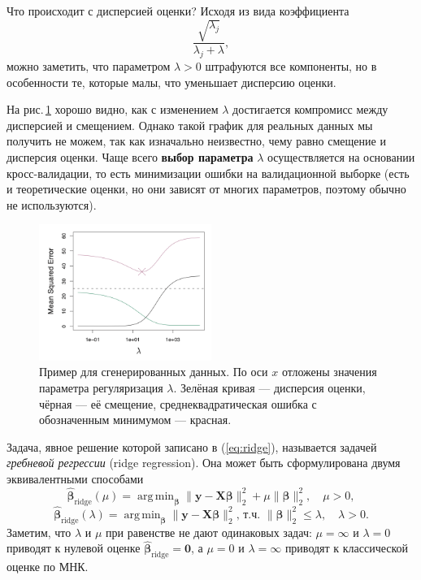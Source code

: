 \documentclass[12pt,a4paper,final]{article}
\newcommand{\betah}{\hat{\bm \beta}}
\newcommand{\betaa}{\bm{\beta}}
\newcommand{\X}{\bm{X}}
\newcommand{\1}{\mathds{1}}
\DeclareMathOperator*{\argmin}{arg\,min}
\begin{document}
Что происходит с дисперсией оценки? Исходя из вида коэффициента
$$
\frac{\sqrt{\lambda_j}}{\lambda_j + \lambda},
$$
можно заметить, что параметром $\lambda > 0$ штрафуются все компоненты, но в особенности те, которые малы, что уменьшает дисперсию оценки.

На рис.\,\ref{fig:rid} хорошо видно, как с изменением $\lambda$ достигается компромисс между дисперсией и смещением. Однако такой график для реальных данных мы получить не можем, так как изначально неизвестно, чему равно смещение и дисперсия оценки.
Чаще всего \textbf{выбор параметра} $\lambda$ осуществляется на основании кросс-валидации, то есть минимизации ошибки на валидационной выборке (есть и теоретические оценки, но они зависят от многих параметров, поэтому обычно не используются). 

\begin{figure}[]
\centering
\includegraphics[width=0.5\textwidth]{ridge2.png}
\caption{Пример для сгенерированных данных. По оси $x$ отложены значения параметра регуляризация $\lambda$. Зелёная кривая --- дисперсия оценки, чёрная --- её смещение, среднеквадратическая ошибка с обозначенным минимумом --- красная.}
\label{fig:rid}
\end{figure}

Задача, явное решение которой записано в (\ref{eq:ridge}), называется задачей \textit{гребневой регрессии} (ridge regression). Она может быть сформулирована двумя эквивалентными способами
\begin{equation}
\label{eq:rid1}
 \betah_{\text{ridge}}(\mu) = \argmin_{\betaa}{\|\bm y - \X\betaa\|^2_2 +\mu \|\betaa\|^2_2}, \quad \mu >0,
\end{equation}
\begin{equation}
\label{eq:rid2}
\betah_{\text{ridge}}(\lambda) = \argmin_{\betaa}{\|\bm y - \X\betaa\|^2_2 \text{, т.ч. } \|\betaa\|^2_2 \leqslant \lambda}, \quad \lambda >0.
\end{equation}
Заметим, что $\lambda$ и $\mu$ при равенстве не дают одинаковых задач: $\mu = \infty$ и $\lambda = 0$ приводят к нулевой оценке $\betah_{\text{ridge}} = \bm 0$, а $\mu = 0$ и $\lambda = \infty$ приводят к классической оценке по МНК.
\end{document}
